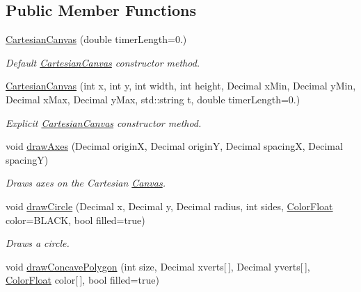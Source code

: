 \subsection*{\-Public \-Member \-Functions}
\begin{DoxyCompactItemize}
\item 
\hyperlink{classtsgl_1_1_cartesian_canvas_a4438f368eae3def6a70e0faa15d28daa}{\-Cartesian\-Canvas} (double timer\-Length=0.)
\begin{DoxyCompactList}\small\item\em \-Default \hyperlink{classtsgl_1_1_cartesian_canvas}{\-Cartesian\-Canvas} constructor method. \end{DoxyCompactList}\item 
\hyperlink{classtsgl_1_1_cartesian_canvas_a7ca80bfa69d89fdbe110a7ec3aa6f100}{\-Cartesian\-Canvas} (int x, int y, int width, int height, \-Decimal x\-Min, \-Decimal y\-Min, \-Decimal x\-Max, \-Decimal y\-Max, std\-::string t, double timer\-Length=0.)
\begin{DoxyCompactList}\small\item\em \-Explicit \hyperlink{classtsgl_1_1_cartesian_canvas}{\-Cartesian\-Canvas} constructor method. \end{DoxyCompactList}\item 
void \hyperlink{classtsgl_1_1_cartesian_canvas_a1b08e3c0d692603fd2bf56e38eb19907}{draw\-Axes} (\-Decimal origin\-X, \-Decimal origin\-Y, \-Decimal spacing\-X, \-Decimal spacing\-Y)
\begin{DoxyCompactList}\small\item\em \-Draws axes on the \-Cartesian \hyperlink{classtsgl_1_1_canvas}{\-Canvas}. \end{DoxyCompactList}\item 
void \hyperlink{classtsgl_1_1_cartesian_canvas_a64e128195cbcf9b60dbe478d6f489d67}{draw\-Circle} (\-Decimal x, \-Decimal y, \-Decimal radius, int sides, \hyperlink{structtsgl_1_1_color_float}{\-Color\-Float} color=\-B\-L\-A\-C\-K, bool filled=true)
\begin{DoxyCompactList}\small\item\em \-Draws a circle. \end{DoxyCompactList}\item 
void \hyperlink{classtsgl_1_1_cartesian_canvas_a7f84b79ab6fd77277c5c71fce7d0ec6a}{draw\-Concave\-Polygon} (int size, \-Decimal xverts\mbox{[}$\,$\mbox{]}, \-Decimal yverts\mbox{[}$\,$\mbox{]}, \hyperlink{structtsgl_1_1_color_float}{\-Color\-Float} color\mbox{[}$\,$\mbox{]}, bool filled=true)

\end{DoxyCompactItemize}
